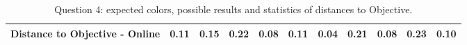 \begin{table}[H]
{\begin{tabular}{lccccccccccccc}
    \multicolumn{4}{l}{Distance to Objective - Online}                                                                                               & \multicolumn{1}{|c}{0.11}       & \multicolumn{1}{c|}{0.15}    & \multicolumn{1}{|c}{0.22}       & \multicolumn{1}{c|}{0.08}    & \multicolumn{1}{|c}{\textbf{0.11}}         & \multicolumn{1}{c|}{0.04}    & \multicolumn{1}{|c}{0.21}        & \multicolumn{1}{c|}{0.08}    & \multicolumn{1}{|c}{0.23}       & \multicolumn{1}{c|}{0.10}    \\ \hline
    \end{tabular}}
  \caption[Question 4, with expected Results.]{Question 4: expected colors, possible results and statistics of distances to Objective.}
  \vspace{-5pt}
  \label{table:lab_q4_expected}
\end{table}
%
